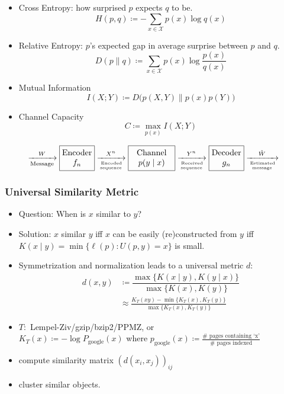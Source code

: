 \documentclass[UTF8,11pt,colorlinks,compress,openany]{beamer}%
\begin{document}
\begin{frame}\frametitle{}
\begin{itemize}
	\item Cross Entropy: how surprised $p$ expects $q$ to be.
	\[H(p,q)\coloneqq -\sum\limits_{x\in\mathcal{X}}p(x)\log q(x)\]
	\item Relative Entropy: $p$'s expected gap in average surprise between $p$ and $q$.
	\[D(p\|q)\coloneqq \sum\limits_{x\in\mathcal{X}}p(x)\log\frac{p(x)}{q(x)}\]
	\item Mutual Information
	\[I(X;Y)\coloneqq D\big(p(X,Y)\|p(x)p(Y)\big)\]
	\item Channel Capacity
	\[C\coloneqq\max\limits_{p(x)}I(X;Y)\]
\end{itemize}
\[\xrightarrow[\text{Message}]{W}\framebox[1.5cm]{$\begin{matrix}
		\text{Encoder}\\
		f_n
		\end{matrix}$}\xrightarrow[\text{Encoded}\atop{\text{sequence}}]{X^n}\framebox[2cm]{
		$
		\begin{matrix}
		\text{Channel}\\
		p(y\mid x)
		\end{matrix}
		$
	}\xrightarrow[\text{Received}\atop{\text{sequence}}]{Y^n}\framebox[1.5cm]{$\begin{matrix}
			\text{Decoder}\\
			g_n
			\end{matrix}$}\xrightarrow[\text{Estimated}\atop{\text{message}}]{\hat{W}}\]
\end{frame}

\begin{frame}\frametitle{Universal Similarity Metric}
\begin{itemize}
	\item Question: When is $x$ similar to $y$?
	\item Solution: $x$ similar $y$ iff $x$ can be easily (re)constructed from $y$ iff $K(x\mid y)=\min\{\ell(p):U(p,y)=x\}$ is small.
	\item Symmetrization and normalization leads to a universal metric $d$:
	\begin{align*}
	d(x,y)&\coloneqq \dfrac{\max\{K(x\mid y),K(y\mid x)\}}{\max\{K(x), K(y)\}}\\
	&\approx\frac{K_T(xy)-\min\{K_T(x),K_T(y)\}}{\max\{K_T(x),K_T(y)\}}
	\end{align*}
	\item $T:$ Lempel-Ziv/gzip/bzip2/PPMZ, or\\
		$K_T(x)\coloneqq -\log P_\mathrm{google}(x)$ where $p_\mathrm{google}(x)\coloneqq \frac{\# \mbox{ pages containing `x'}}{\# \mbox{ pages indexed}}$
	\item compute similarity matrix $\left(d(x_i,x_j)\right)_{ij}$
	\item cluster similar objects.
\end{itemize}
\end{frame}
\end{document}
